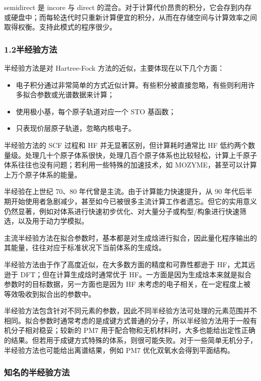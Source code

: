 semidirect 是 incore 与 direct 的混合。对于计算代价昂贵的积分，它会存到内存或硬盘中；而每轮迭代时只重新计算便宜的积分，从而在存储空间与计算效率之间取得权衡。支持此模式的程序很少。

\subsubsection*{1.2\quad 半经验方法}

半经验方法是对 Hartree-Fock 方法的近似，主要体现在以下几个方面：
\begin{itemize}
  \item 电子积分通过非常简单的方式近似计算。有些积分被直接忽略，有些则利用许多拟合参数或光谱数据来计算；
  \item 使用极小基，每个原子轨道对应一个 STO 基函数；
  \item 只表现价层原子轨道，忽略内核电子。
\end{itemize}

半经验方法的 SCF 过程和 HF 并无显著区别，但计算耗时通常比 HF 低约两个数量级。处理几十个原子体系很快，处理几百个原子体系也比较轻松，计算上千原子体系往往也没有问题；若利用一些特殊的加速技术，如 MOZYME，甚至可以计算上万个原子体系的能量。

半经验在上世纪 70、80 年代曾是主流。由于计算能力快速提升，从 90 年代后半期开始使用者急剧减少，甚至如今已被很多主流计算工作者遗忘。但它的实用意义仍然显著，例如对体系进行快速初步优化、对大量分子或构型/构象进行快速筛选，以及用于动力学模拟。

主流半经验方法在拟合参数时，基本都是对生成焓进行拟合，因此量化程序输出的其能量，往往对应于标准状况下当前体系的生成焓。

半经验方法由于作了高度近似，在大多数方面的精度和可靠性都逊于 HF，尤其远逊于 DFT；但在计算生成焓时通常优于 HF。一方面是因为生成焓本来就是拟合参数时的目标数据，另一方面也是因为 HF 未考虑的电子相关，在一定程度上被等效吸收到拟合出的参数中。

半经验方法包含针对不同元素的参数，因此不同半经验方法可处理的元素范围并不相同。拟合参数时通常考虑的是成键方式普通的分子，所以半经验方法用于一般有机分子相对稳妥；较新的 PM7 用于配合物和无机材料时，大多也能给出定性正确的结果。但若用于成键方式特殊的体系，则很可能失败。对于一些简单无机分子，半经验方法也可能给出离谱结果，例如 PM7 优化双氧水会得到平面结构。

\subsubsection*{知名的半经验方法}

